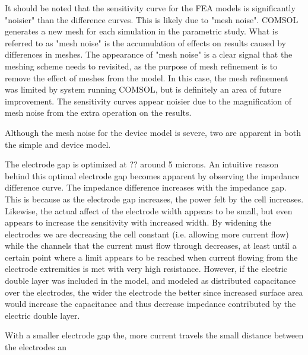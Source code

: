 \par It should be noted that the sensitivity curve for the FEA models is significantly "noisier" than the difference curves. This is likely due to "mesh noise". COMSOL generates a new mesh for each simulation in the parametric study. What is referred to as "mesh noise" is the accumulation of effects on results caused by differences in meshes. The appearance of "mesh noise" is a clear signal that the meshing scheme needs to revisited, as the purpose of mesh refinement is to remove the effect of meshes from the model. In this case, the mesh refinement was limited by system running COMSOL, but is definitely an area of future improvement. The sensitivity curves appear noisier due to the magnification of mesh noise from the extra operation on the results.

\par Although the mesh noise for the device model is severe, two are apparent in both the simple and device model.

\par The electrode gap is optimized at ?? around 5 microns. An intuitive reason behind this optimal electrode gap becomes apparent by observing the impedance difference curve. The impedance difference increases with the impedance gap. This is because as the electrode gap increases, the power felt by the cell increases. Likewise, the actual affect of the electrode width appears to be small, but even appears to increase the sensitivity with increased width. By widening the electrodes we are decreasing the cell constant (i.e. allowing more current flow) while the channels that the current must flow through decreases, at least until a certain point where a limit appears to be reached when current flowing from the electrode extremities is met with very high resistance. However, if the electric double layer was included in the model, and modeled as distributed capacitance over the electrodes, the wider the electrode the better since increased surface area would increase the capacitance and thus decrease impedance contributed by the electric double layer. 
\par With a smaller electrode gap the, more current travels the small distance between the electrodes an

